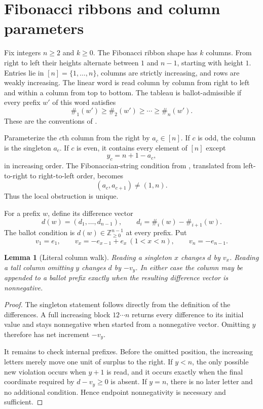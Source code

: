 \documentclass[11pt]{article}
\newtheorem{lemma}[theorem]{Lemma}
\theoremstyle{definition}
\begin{document}
\section{Fibonacci ribbons and column parameters}

Fix integers $n\ge2$ and $k\ge0$.  The Fibonacci ribbon shape has $k$
columns.  From right to left their heights alternate between $1$ and $n-1$,
starting with height $1$.  Entries lie in $[n]=\{1,\ldots,n\}$, columns are
strictly increasing, and rows are weakly increasing.  The linear word is read
column by column from right to left and within a column from top to bottom.
The tableau is ballot-admissible if every prefix $w'$ of this word satisfies
\[
 \#_1(w')\ge\#_2(w')\ge\cdots\ge\#_n(w').
\]
These are the conventions of \cite{DonnellyEtAl2023,Tenn2026}.

Parameterize the $c$th column from the right by $a_c\in[n]$.  If $c$ is odd,
the column is the singleton $a_c$.  If $c$ is even, it contains every element
of $[n]$ except
\[
 y_c=n+1-a_c,
\]
in increasing order.  The Fibonaccian-string condition from
\cite[Theorem~4.2]{DonnellyEtAl2023}, translated from left-to-right to
right-to-left order, becomes
\begin{equation}\label{eq:local-obstruction}
 (a_c,a_{c+1})\ne(1,n).
\end{equation}
Thus the local obstruction is unique.

For a prefix $w$, define its difference vector
\[
 d(w)=(d_1,\ldots,d_{n-1}),\qquad
 d_i=\#_i(w)-\#_{i+1}(w).
\]
The ballot condition is $d(w)\in\mathbb Z_{\ge0}^{n-1}$ at every prefix.
Put
\[
 v_1=e_1,\qquad
 v_x=-e_{x-1}+e_x\ (1<x<n),\qquad
 v_n=-e_{n-1}.
\]

\begin{lemma}[Literal column walk]\label{lem:column-walk}
Reading a singleton $x$ changes $d$ by $v_x$.  Reading a tall column omitting
$y$ changes $d$ by $-v_y$.  In either case the column may be appended to a
ballot prefix exactly when the resulting difference vector is nonnegative.
\end{lemma}

\begin{proof}
The singleton statement follows directly from the definition of the
differences.  A full increasing block $12\cdots n$ returns every difference
to its initial value and stays nonnegative when started from a nonnegative
vector.  Omitting $y$ therefore has net increment $-v_y$.

It remains to check internal prefixes.  Before the omitted position, the
increasing letters merely move one unit of surplus to the right.  If $y<n$,
the only possible new violation occurs when $y+1$ is read, and it occurs
exactly when the final coordinate required by $d-v_y\ge0$ is absent.  If
$y=n$, there is no later letter and no additional condition.  Hence endpoint
nonnegativity is necessary and sufficient.
\end{proof}
\end{document}
